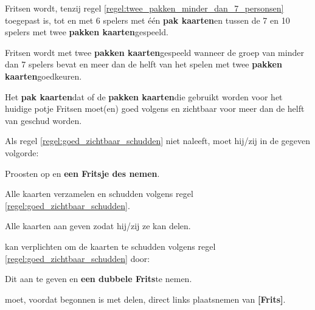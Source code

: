 \vervolgLijst{}
    \item Fritsen wordt, tenzij regel \ref{regel:twee_pakken_minder_dan_7_personsen} toegepast is, tot en met 6 spelers met één \textbf{pak kaarten}\footnotemark[1] en tussen de 7 en 10 spelers met twee \textbf{pakken kaarten}\footnotemark[1] gespeeld.
\eindLijst{}

\vervolgLijst{}
    \item Fritsen wordt met twee \textbf{pakken kaarten}\footnotemark[1] gespeeld wanneer de groep van \alleSpelers minder dan 7 spelers bevat en meer dan de helft van \alleSpelers het spelen met twee \textbf{pakken kaarten}\footnotemark[1] goedkeuren. \label{regel:twee_pakken_minder_dan_7_personsen}
\eindLijst{}

\vervolgLijst{}
    \item Het \textbf{pak kaarten}\footnotemark[1] dat of de \textbf{pakken kaarten}\footnotemark[1] die gebruikt worden voor het huidige potje Fritsen moet(en) goed volgens en zichtbaar voor meer dan de helft van \alleSpelers geschud worden.
    \label{regel:goed_zichtbaar_schudden}
\eindLijst{}

\vervolgLijst{}
    \item Als \eenSpeler regel \ref{regel:goed_zichtbaar_schudden} niet naleeft, moet hij/zij in de gegeven volgorde:
    \puntLijst{}
        \item Proosten op  en \textbf{een Fritsje des nemen}\footnotemark[2].
        \item Alle kaarten verzamelen en schudden volgens regel \ref{regel:goed_zichtbaar_schudden}.
        \item Alle kaarten aan \Frits geven zodat hij/zij ze kan delen.
    \eindPuntLijst{}
\eindLijst{}

\vervolgLijst{}
    \item \Frits kan \eenSpeler verplichten om de kaarten te schudden volgens regel \ref{regel:goed_zichtbaar_schudden} door:
    \puntLijst{}
        \item Dit aan te geven en \textbf{een dubbele Frits}\footnotemark[3] te nemen.
    \eindPuntLijst{}
\eindLijst{}


\vervolgLijst{}
    \item \Willem moet, voordat \Frits begonnen is met delen, direct links plaatsnemen van \textbf{[Frits]}.
    \label{regel:Willen_links_van_Frits}
\eindLijst{}

